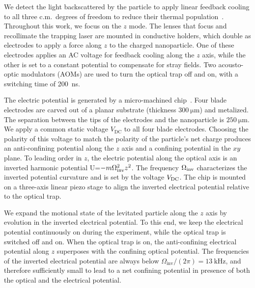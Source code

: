 \documentclass[aps,prl,reprint,twocolumn,superscriptaddress]{revtex4-2}
\begin{document}
We detect the light backscattered by the particle \cite{tebbenjohanns2019optimal} to apply linear feedback cooling to all three c.m.\ degrees of freedom to reduce their thermal population~\cite{tebbenjohanns2019cold}. Throughout this work, we focus on the $z$ mode.
%
The lenses that focus and recollimate the trapping laser are mounted in conductive holders, which double as electrodes to apply a force along $ z$ to the charged nanoparticle.
One of these electrodes applies an AC voltage for feedback cooling along the $z$ axis, while the other is set to a constant potential to compensate for stray fields. 
Two acousto-optic modulators (AOMs) are used to turn the optical trap off and on, with a switching time of \SI{200}{\nano\second}. 

The electric potential is generated by a micro-machined chip~\cite{bonvin2024hybrid}. 
Four blade electrodes are carved out of a planar substrate (thickness $\SI{300}{\micro\meter}$) and metalized. The separation between the tips of the electrodes and the nanoparticle is $\SI{250}{\micro \meter}$. We apply a common static voltage $V_\text{DC}$ to all four blade electrodes. Choosing the polarity of this voltage to match the polarity of the particle's net charge produces an anti-confining potential along the $z$ axis and a confining potential in the $xy$ plane.
To leading order in $z$, the electric potential along the optical axis is an inverted harmonic potential U=$-m\Omega_{\rm inv}^2z^2$.
The frequency $\Omega_{\rm inv}$ characterizes the inverted potential curvature and is set by the voltage $V_{\rm DC}$.  
The chip is mounted on a three-axis linear piezo stage to align the inverted electrical potential relative to the optical trap.







We expand the motional state of the levitated particle along the $z$ axis by evolution in the inverted electrical potential. 
To this end, we keep the electrical potential continuously on during the experiment, while the optical trap is switched off and on. When the optical trap is on, the anti-confining electrical potential along $z$ superposes with the confining optical potential. The frequencies of the inverted electrical potential are always below $\Omega_\text{inv}/(2\pi) = \SI{13}{\kilo\hertz}$, and therefore sufficiently small to lead to a net confining potential in presence of both the optical and the electrical potential.
\end{document}
